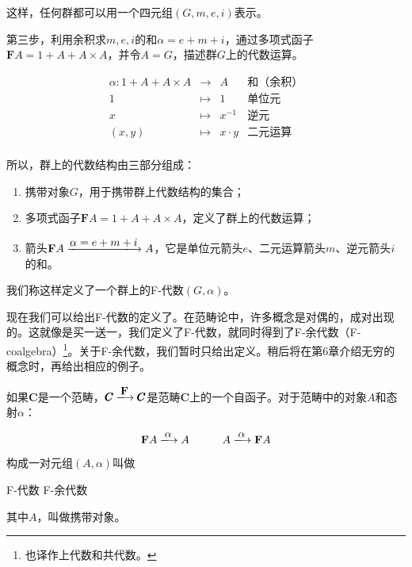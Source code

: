 \documentclass{article}
\begin{document}
\begin{example}
这样，任何群都可以用一个四元组$(G, m, e, i)$表示。

第三步，利用余积求$m, e, i$的和$\alpha = e + m + i$，通过多项式函子$\mathbf{F} A = 1 + A + A \times A$，并令$A = G$，描述群$G$上的代数运算。

\[
\begin{array}{rcll}
\alpha : 1 + A + A \times A & \longrightarrow & A & \text{和（余积）}\\
1 & \longmapsto & 1 & \text{单位元}  \\
x & \longmapsto & x^{-1} & \text{逆元} \\
(x, y) & \longmapsto & x \cdot y & \text{二元运算} \\
\end{array}
\]

所以，群上的代数结构由三部分组成：

\begin{enumerate}
  \item 携带对象$G$，用于携带群上代数结构的集合；
  \item 多项式函子$\mathbf{F} A = 1 + A + A \times A$，定义了群上的代数运算；
  \item 箭头$\mathbf{F} A \arrowto{\alpha = e + m + i} A$，它是单位元箭头$e$、二元运算箭头$m$、逆元箭头$i$的和。
\end{enumerate}

我们称这样定义了一个群上的F-代数$(G, \alpha)$。
\end{example}

 
现在我们可以给出F-代数的定义了。在范畴论中，许多概念是对偶的，成对出现的。这就像是买一送一，我们定义了F-代数，就同时得到了F-余代数（F-coalgebra）\footnote{也译作上代数和共代数。}。关于F-余代数，我们暂时只给出定义。稍后将在第6章介绍无穷的概念时，再给出相应的例子。

\begin{definition}
如果$\pmb{C}$是一个范畴，$\pmb{C} \arrowto{\mathbf{F}} \pmb{C}$是范畴$\pmb{C}$上的一个自函子。对于范畴中的对象$A$和态射$\alpha$：

\[
  \mathbf{F} A \arrowto{\alpha} A
  \quad \quad \quad
  A \arrowto{\alpha} \mathbf{F} A
\]

构成一对元组$(A, \alpha)$叫做

\begin{center}
  F-代数 \quad \quad \quad F-余代数
\end{center}

其中$A$，叫做携带对象。

\end{definition}
\end{document}
